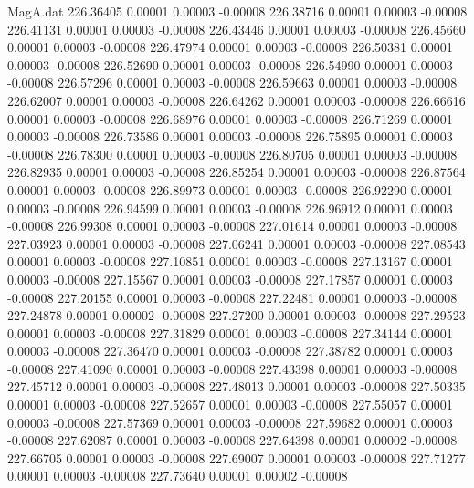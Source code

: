 \begin{filecontents}{MagA.dat}
 226.36405    0.00001    0.00003   -0.00008
 226.38716    0.00001    0.00003   -0.00008
 226.41131    0.00001    0.00003   -0.00008
 226.43446    0.00001    0.00003   -0.00008
 226.45660    0.00001    0.00003   -0.00008
 226.47974    0.00001    0.00003   -0.00008
 226.50381    0.00001    0.00003   -0.00008
 226.52690    0.00001    0.00003   -0.00008
 226.54990    0.00001    0.00003   -0.00008
 226.57296    0.00001    0.00003   -0.00008
 226.59663    0.00001    0.00003   -0.00008
 226.62007    0.00001    0.00003   -0.00008
 226.64262    0.00001    0.00003   -0.00008
 226.66616    0.00001    0.00003   -0.00008
 226.68976    0.00001    0.00003   -0.00008
 226.71269    0.00001    0.00003   -0.00008
 226.73586    0.00001    0.00003   -0.00008
 226.75895    0.00001    0.00003   -0.00008
 226.78300    0.00001    0.00003   -0.00008
 226.80705    0.00001    0.00003   -0.00008
 226.82935    0.00001    0.00003   -0.00008
 226.85254    0.00001    0.00003   -0.00008
 226.87564    0.00001    0.00003   -0.00008
 226.89973    0.00001    0.00003   -0.00008
 226.92290    0.00001    0.00003   -0.00008
 226.94599    0.00001    0.00003   -0.00008
 226.96912    0.00001    0.00003   -0.00008
 226.99308    0.00001    0.00003   -0.00008
 227.01614    0.00001    0.00003   -0.00008
 227.03923    0.00001    0.00003   -0.00008
 227.06241    0.00001    0.00003   -0.00008
 227.08543    0.00001    0.00003   -0.00008
 227.10851    0.00001    0.00003   -0.00008
 227.13167    0.00001    0.00003   -0.00008
 227.15567    0.00001    0.00003   -0.00008
 227.17857    0.00001    0.00003   -0.00008
 227.20155    0.00001    0.00003   -0.00008
 227.22481    0.00001    0.00003   -0.00008
 227.24878    0.00001    0.00002   -0.00008
 227.27200    0.00001    0.00003   -0.00008
 227.29523    0.00001    0.00003   -0.00008
 227.31829    0.00001    0.00003   -0.00008
 227.34144    0.00001    0.00003   -0.00008
 227.36470    0.00001    0.00003   -0.00008
 227.38782    0.00001    0.00003   -0.00008
 227.41090    0.00001    0.00003   -0.00008
 227.43398    0.00001    0.00003   -0.00008
 227.45712    0.00001    0.00003   -0.00008
 227.48013    0.00001    0.00003   -0.00008
 227.50335    0.00001    0.00003   -0.00008
 227.52657    0.00001    0.00003   -0.00008
 227.55057    0.00001    0.00003   -0.00008
 227.57369    0.00001    0.00003   -0.00008
 227.59682    0.00001    0.00003   -0.00008
 227.62087    0.00001    0.00003   -0.00008
 227.64398    0.00001    0.00002   -0.00008
 227.66705    0.00001    0.00003   -0.00008
 227.69007    0.00001    0.00003   -0.00008
 227.71277    0.00001    0.00003   -0.00008
 227.73640    0.00001    0.00002   -0.00008

\end{filecontents}
